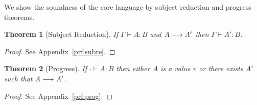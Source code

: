 \newtheorem{thm}{Theorem}[section]
\newtheorem{cor}{Corollary}[thm]
\newtheorem{lem}[thm]{Lemma}

\newcommand{\dotctx}[1]{\ctx[\cdot]{#1}}
\newcommand{\dotctxw}[2]{\ctxw[\cdot]{#1}{#2}}

We show the soundness of the core language by subject reduction and
progress theorems.

\begin{thm}[Subject Reduction]
  If $\Gamma \vdash A:B$ and $A \longrightarrow A'$ then $\Gamma \vdash A':B$.
\end{thm}

\begin{proof}
See Appendix~\ref{prf:subre}.
\end{proof}

\begin{thm}[Progress]
  If $\cdot \vdash A:B$ then either $A$ is a value $v$ or there exists
  $A'$ such that $A \longrightarrow A'$.
\end{thm}

\begin{proof}
See Appendix~\ref{prf:prog}.
\end{proof}
